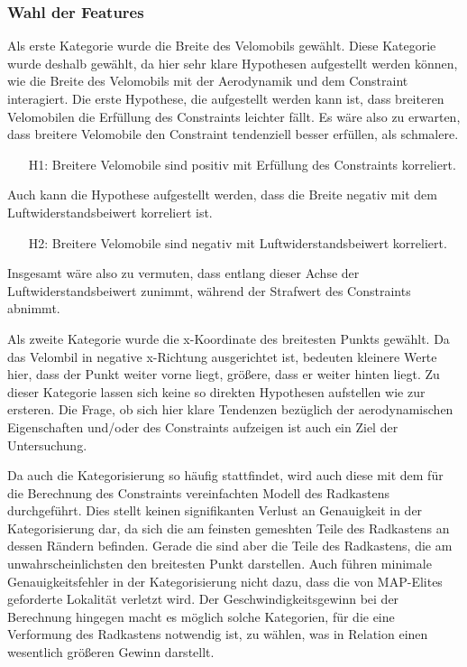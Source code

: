 \subsubsection{Wahl der Features}

Als erste Kategorie wurde die Breite des Velomobils gewählt.
Diese Kategorie wurde deshalb gewählt, da hier sehr klare Hypothesen aufgestellt werden können, wie die Breite des Velomobils mit der Aerodynamik und dem Constraint interagiert.
Die erste Hypothese, die aufgestellt werden kann ist, dass breiteren Velomobilen die Erfüllung des Constraints leichter fällt. Es wäre also zu erwarten, dass breitere Velomobile den Constraint tendenziell besser erfüllen, als schmalere.
\begin{itemize}
	\item[H1:] Breitere Velomobile sind positiv mit Erfüllung des Constraints korreliert.
\end{itemize}
Auch kann die Hypothese aufgestellt werden, dass die Breite negativ mit dem Luftwiderstandsbeiwert korreliert ist.
\begin{itemize}
	\item[H2:] Breitere Velomobile sind negativ mit Luftwiderstandsbeiwert korreliert.
\end{itemize}
Insgesamt wäre also zu vermuten, dass entlang dieser Achse der Luftwiderstandsbeiwert zunimmt, während der Strafwert des Constraints abnimmt.

Als zweite Kategorie wurde die x-Koordinate des breitesten Punkts gewählt.
Da das Velombil in negative x-Richtung ausgerichtet ist, bedeuten kleinere Werte hier, dass der Punkt weiter vorne liegt, größere, dass er weiter hinten liegt.
Zu dieser Kategorie lassen sich keine so direkten Hypothesen aufstellen wie zur ersteren.
Die Frage, ob sich hier klare Tendenzen bezüglich der aerodynamischen Eigenschaften und/oder des Constraints aufzeigen ist auch ein Ziel der Untersuchung.

Da auch die Kategorisierung so häufig stattfindet, wird auch diese mit dem für die Berechnung des Constraints vereinfachten Modell des Radkastens durchgeführt. 
Dies stellt keinen signifikanten Verlust an Genauigkeit in der Kategorisierung dar, da sich die am feinsten gemeshten Teile des Radkastens an dessen Rändern befinden.
Gerade die sind aber die Teile des Radkastens, die am unwahrscheinlichsten den breitesten Punkt darstellen.
Auch führen minimale Genauigkeitsfehler in der Kategorisierung nicht dazu, dass die von MAP-Elites geforderte Lokalität verletzt wird.
Der Geschwindigkeitsgewinn bei der Berechnung hingegen macht es möglich solche Kategorien, für die eine Verformung des Radkastens notwendig ist, zu wählen, was in Relation einen wesentlich größeren Gewinn darstellt.

